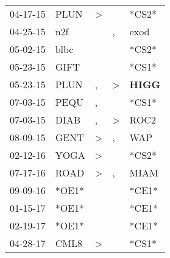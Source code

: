 \begin{supertabular}{p{0.07\textwidth}p{0.06\textwidth}p{0.02\textwidth}p{0.02\textwidth}p{0.06\textwidth}}
          04-17-15\textsuperscript{} &           PLUN\textsuperscript{} &     \textgreater &                  &                            *CS2* \\
          04-25-15\textsuperscript{} &            n2f\textsuperscript{} &                  &                , &           exod\textsuperscript{} \\
          05-02-15\textsuperscript{} &           blbc\textsuperscript{} &                  &                  &                            *CS2* \\
          05-23-15\textsuperscript{} &           GIFT\textsuperscript{} &                  &                  &                            *CS1* \\
          05-23-15\textsuperscript{} &           PLUN\textsuperscript{} &                , &     \textgreater &  \textbf{HIGG\textsuperscript{}} \\
          07-03-15\textsuperscript{} &           PEQU\textsuperscript{} &                , &                  &                            *CS1* \\
          07-03-15\textsuperscript{} &           DIAB\textsuperscript{} &                , &     \textgreater &           ROC2\textsuperscript{} \\
          08-09-15\textsuperscript{} &           GENT\textsuperscript{} &     \textgreater &                , &            WAP\textsuperscript{} \\
          02-12-16\textsuperscript{} &           YOGA\textsuperscript{} &     \textgreater &                  &                            *CS2* \\
          07-17-16\textsuperscript{} &           ROAD\textsuperscript{} &     \textgreater &                , &           MIAM\textsuperscript{} \\
          09-09-16\textsuperscript{} &                            *OE1* &                  &                  &                            *CE1* \\
          01-15-17\textsuperscript{} &                            *OE1* &                  &                  &                            *CE1* \\
          02-19-17\textsuperscript{} &                            *OE1* &                  &                  &                            *CE1* \\
          04-28-17\textsuperscript{} &           CML8\textsuperscript{} &     \textgreater &                  &                            *CS1* \\

\end{supertabular}
